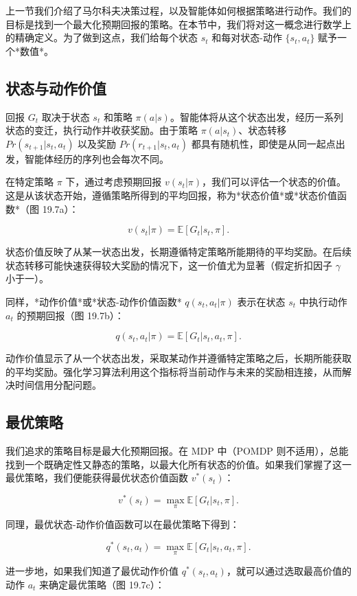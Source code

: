 上一节我们介绍了马尔科夫决策过程，以及智能体如何根据策略进行动作。我们的目标是找到一个最大化预期回报的策略。在本节中，我们将对这一概念进行数学上的精确定义。为了做到这点，我们给每个状态 \(s_t\) 和每对状态-动作 \(\{s_t, a_t\}\) 赋予一个*数值*。


\subsection{状态与动作价值}

回报 \(G_t\) 取决于状态 \(s_t\) 和策略 \(\pi(a|s)\)。智能体将从这个状态出发，经历一系列状态的变迁，执行动作并收获奖励。由于策略 \(\pi(a|s_t)\)、状态转移 \(Pr(s_{t+1}|s_t, a_t)\) 以及奖励 \(Pr(r_{t+1}|s_t, a_t)\) 都具有随机性，即使是从同一起点出发，智能体经历的序列也会每次不同。

在特定策略 \(\pi\) 下，通过考虑预期回报 \(v(s_t|\pi)\)，我们可以评估一个状态的价值。这是从该状态开始，遵循策略所得到的平均回报，称为*状态价值*或*状态价值函数*（图 19.7a）：

\[
v(s_t|\pi) = \mathbb{E} [ G_t|s_t, \pi ]. \tag{19.2}
\]

状态价值反映了从某一状态出发，长期遵循特定策略所能期待的平均奖励。在后续状态转移可能快速获得较大奖励的情况下，这一价值尤为显著（假定折扣因子 \(\gamma\) 小于一）。

同样，*动作价值*或*状态-动作价值函数* \(q(s_t, a_t|\pi)\) 表示在状态 \(s_t\) 中执行动作 \(a_t\) 的预期回报（图 19.7b）：

\[
q(s_t, a_t|\pi) = \mathbb{E} [ G_t|s_t, a_t, \pi ]. \tag{19.3}
\]

动作价值显示了从一个状态出发，采取某动作并遵循特定策略之后，长期所能获取的平均奖励。强化学习算法利用这个指标将当前动作与未来的奖励相连接，从而解决时间信用分配问题。


\subsection{最优策略}
我们追求的策略目标是最大化预期回报。在 MDP 中（POMDP 则不适用），总能找到一个既确定性又静态的策略，以最大化所有状态的价值。如果我们掌握了这一最优策略，我们便能获得最优状态价值函数 \(v^*(s_t)\)：

\[
v^*(s_t) = \max_{\pi} \mathbb{E} [ G_t|s_t, \pi ].  \tag{19.4}
\]

同理，最优状态-动作价值函数可以在最优策略下得到：

\[
q^*(s_t, a_t) = \max_{\pi} \mathbb{E} [ G_t|s_t, a_t, \pi ]. \tag{19.5}
\]

进一步地，如果我们知道了最优动作价值 \(q^*(s_t, a_t)\)，就可以通过选取最高价值的动作 \(a_t\) 来确定最优策略（图 19.7c）：

